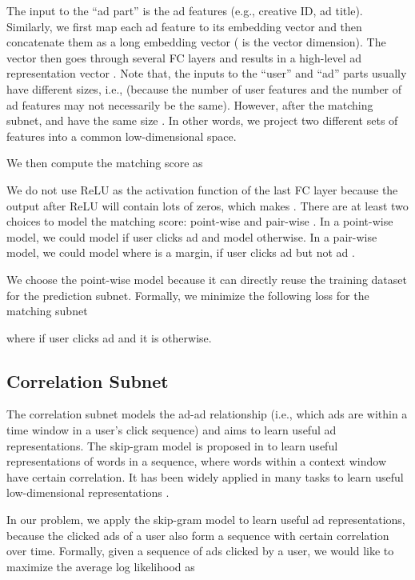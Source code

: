 \documentclass{article}
\begin{document}
The input to the ``ad part'' is the ad features (e.g., creative ID, ad title). Similarly, we first map each ad feature to its embedding vector and then concatenate them as a long embedding vector  ( is the vector dimension).
The vector  then goes through several FC layers and results in a high-level ad representation vector .
Note that, the inputs to the ``user'' and ``ad'' parts usually have different sizes, i.e.,  (because the number of user features and the number of ad features may not necessarily be the same). However, after the matching subnet,  and  have the same size . In other words, we project two different sets of features into a common low-dimensional space.

We then compute the matching score  as

We do not use ReLU as the activation function of the last FC layer because the output after ReLU will contain lots of zeros, which makes .
There are at least two choices to model the matching score: point-wise and pair-wise \cite{liu2009learning}. In a point-wise model, we could model  if user  clicks ad  and model  otherwise. In a pair-wise model, we could model  where  is a margin, if user  clicks ad  but not ad .

We choose the point-wise model because it can directly reuse the training dataset for the prediction subnet.
Formally, we minimize the following loss for the matching subnet

where  if user  clicks ad  and it is  otherwise.

\subsection{Correlation Subnet}
The correlation subnet models the ad-ad relationship (i.e., which ads are within a time window in a user's click sequence) and aims to learn useful ad representations.
The skip-gram model is proposed in \cite{mikolov2013distributed} to learn useful representations of words in a sequence, where words within a context window have certain correlation. It has been widely applied in many tasks to learn useful low-dimensional representations \cite{zhao2018learning,zhou2018deep}.

In our problem, we apply the skip-gram model to learn useful ad representations, because the clicked ads of a user also form a sequence with certain correlation over time. Formally, given a sequence of ads  clicked by a user, we would like to maximize the average log likelihood as
\end{document}
